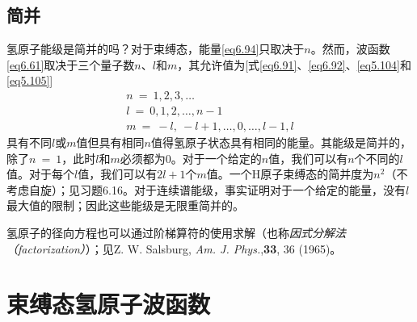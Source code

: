 \documentclass[12pt,a4paper,openany]{ctexbook}
\begin{document}
\subsection{简并}
\begin{flushleft}
    \setlength{\parindent}{2em}
氢原子能级是简并的吗？对于束缚态，能量\eqref{eq6.94}只取决于$n$。然而，波函数\eqref{eq6.61}取决于三个量子数$n$、$l$和$m$，其允许值为[式\eqref{eq6.91}、\eqref{eq6.92}、\eqref{eq5.104}和\eqref{eq5.105}]
\begin{gather}
    \boxed{n\ =\ 1,2,3,\dots} \label{eq6.96} \\
    \boxed{l\ =\ 0,1,2,\dots,n-1} \label{eq6.97} \\
    \boxed{m\ =\ -l,\ -l+1,\dots,0,\dots,l-1,l} \label{eq6.98}
\end{gather}
具有不同$l$或$m$值但具有相同$n$值得氢原子状态具有相同的能量。其能级是简并的，除了$n\ =\ 1$，此时$l$和$m$必须都为$0$。对于一个给定的$n$值，我们可以有$n$个不同的$l$值。对于每个$l$值，我们可以有$2l+1$个$m$值。一个H原子束缚态的简并度为$n^2$（不考虑自旋）；见习题6.16。对于连续谱能级，事实证明对于一个给定的能量，没有$l$最大值的限制；因此这些能级是无限重简并的。

氢原子的径向方程也可以通过阶梯算符的使用求解（也称\textit{因式分解法（factorization）}）；见Z. W. Salsburg, \textit{Am. J. Phys.},\textbf{33}, 36 (1965)。

\end{flushleft}

\section{束缚态氢原子波函数}
\end{document}
